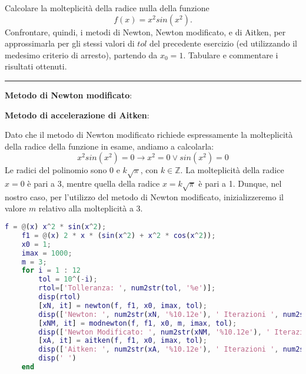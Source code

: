 Calcolare la molteplicità della radice nulla della funzione
$$f(x)=x^{2}sin(x^{2}).$$
Confrontare, quindi, i metodi di Newton, Newton modificato, e di Aitken, per approssimarla per gli
stessi valori di $tol$ del precedente esercizio (ed utilizzando il medesimo criterio di arresto),
partendo da $x_\mathrm{0}=1$. Tabulare e commentare i risultati ottenuti.

\hspace{1cm}
\par\noindent\rule{\textwidth}{0.4pt}
\hspace{1cm}

\textbf{Metodo di Newton modificato}:

\textbf{Metodo di accelerazione di Aitken}:


Dato che il metodo di Newton modificato richiede espressamente la molteplicità della radice 
della funzione in esame, andiamo a calcolarla:\\
$$x^{2}sin(x^{2})=0 \rightarrow x^{2}=0 \lor sin(x^{2})=0$$
Le radici del polinomio sono $0$ e $k\sqrt{\pi}$, con $k\in\mathbb{Z}$.
La molteplicità della radice $x=0$ è pari a 3, mentre quella della radice $x=k\sqrt{\pi}$ è pari a 1.
Dunque, nel nostro caso, per l'utilizzo del metodo di Newton modificato, inizializzeremo il valore $m$
relativo alla molteplicità a 3.

\begin{lstlisting}[language=Matlab, caption=Codice Matlab]
	f = @(x) x^2 * sin(x^2);
	f1 = @(x) 2 * x * (sin(x^2) + x^2 * cos(x^2));
	x0 = 1;
	imax = 1000;
	m = 3;
	for i = 1 : 12
		tol = 10^(-i);
		rtol=['Tolleranza: ', num2str(tol, '%e')];
		disp(rtol)
		[xN, it] = newton(f, f1, x0, imax, tol);
		disp(['Newton: ', num2str(xN, '%10.12e'), ' Iterazioni ', num2str(it)])
		[xNM, it] = modnewton(f, f1, x0, m, imax, tol);
		disp(['Newton Modificato: ', num2str(xNM, '%10.12e'), ' Iterazioni ', num2str(it)])
		[xA, it] = aitken(f, f1, x0, imax, tol);
		disp(['Aitken: ', num2str(xA, '%10.12e'), ' Iterazioni ', num2str(it)])
		disp(' ')
	end
\end{lstlisting}

